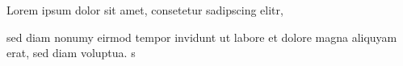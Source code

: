 \documentclass{book}
\begin{document}
\beginnumbering
\pstart
Lorem ipsum dolor sit amet, consetetur sadipscing elitr,  sed diam nonumy eirmod tempor invidunt ut labore et dolore magna aliquyam erat, sed diam voluptua. 
\pend
\endnumbering
s

\newpage
\leftmark\rightmark
\end{document}
